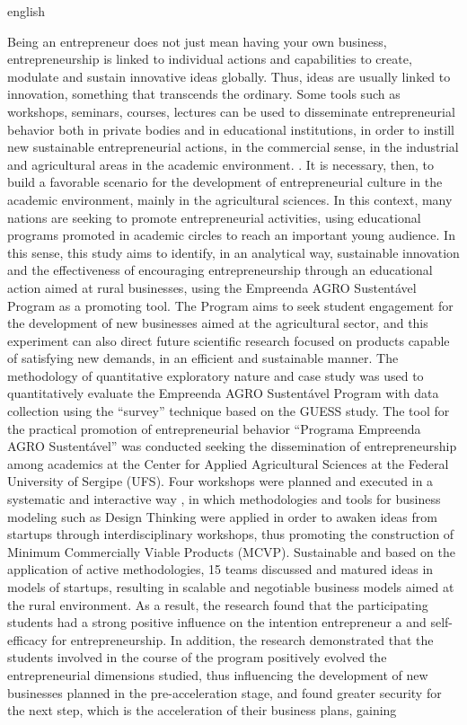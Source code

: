 \setlength{\absparsep}{18pt} %
\begin{resumo}[Abstract]
 \begin{otherlanguage*}{english}
   
Being an entrepreneur does not just mean having your own business, entrepreneurship is linked to individual actions and capabilities to create, modulate and sustain innovative ideas globally. Thus, ideas are usually linked to innovation, something that transcends the ordinary. Some tools such as workshops, seminars, courses, lectures can be used to disseminate entrepreneurial behavior both in private bodies and in educational institutions, in order to instill new sustainable entrepreneurial actions, in the commercial sense, in the industrial and agricultural areas in the academic environment. . It is necessary, then, to build a favorable scenario for the development of entrepreneurial culture in the academic environment, mainly in the agricultural sciences. In this context, many nations are seeking to promote entrepreneurial activities, using educational programs promoted in academic circles to reach an important young audience. In this sense, this study aims to identify, in an analytical way, sustainable innovation and the effectiveness of encouraging entrepreneurship through an educational action aimed at rural businesses, using the Empreenda AGRO Sustentável Program as a promoting tool. The Program aims to seek student engagement for the development of new businesses aimed at the agricultural sector, and this experiment can also direct future scientific research focused on products capable of satisfying new demands, in an efficient and sustainable manner. The methodology of quantitative exploratory nature and case study was used to quantitatively evaluate the Empreenda AGRO Sustentável Program with data collection using the “survey” technique based on the GUESS study. The tool for the practical promotion of entrepreneurial behavior “Programa Empreenda AGRO Sustentável” was conducted seeking the dissemination of entrepreneurship among academics at the Center for Applied Agricultural Sciences at the Federal University of Sergipe (UFS). Four workshops were planned and executed in a systematic and interactive way , in which methodologies and tools for business modeling such as Design Thinking were applied in order to awaken ideas from startups through interdisciplinary workshops, thus promoting the construction of Minimum Commercially Viable Products (MCVP). Sustainable and based on the application of active methodologies, 15 teams discussed and matured ideas in models of startups, resulting in scalable and negotiable business models aimed at the rural environment. As a result, the research found that the participating students had a strong positive influence on the intention entrepreneur a and self-efficacy for entrepreneurship. In addition, the research demonstrated that the students involved in the course of the program positively evolved the entrepreneurial dimensions studied, thus influencing the development of new businesses planned in the pre-acceleration stage, and found greater security for the next step, which is the acceleration of their business plans, gaining 
\end{otherlanguage*}
\end{resumo}
